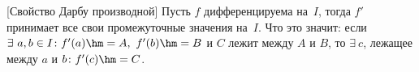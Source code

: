 [Свойство Дарбу производной]\label{Darbu}
    Пусть $f$ дифференцируема на~$I$, тогда $f'$ принимает все свои промежуточные значения на~$I$. Что это значит:
    если $\exists\  a,b\in I\colon f'(a)\hm=A,\ f'(b)\hm=B$ и $C$ лежит между $A$ и $B$, то $\exists\  c$, лежащее между $a$ и $b\colon f'(c)\hm=C$.
